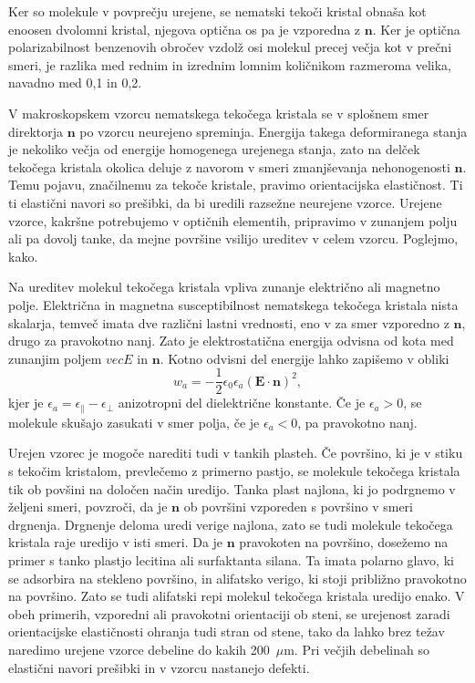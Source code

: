 Ker so molekule v povprečju urejene, se nematski tekoči kristal obnaša kot enoosen 
dvolomni kristal, njegova optična os pa je vzporedna z $\mathbf{n}$. 
Ker je optična polarizabilnost benzenovih obročev vzdolž osi molekul precej večja kot
v prečni smeri, je razlika med rednim in izrednim lomnim količnikom razmeroma velika, navadno med
0,1 in 0,2.

V makroskopskem vzorcu nematskega tekočega kristala se v splošnem smer
direktorja $\mathbf{n}$ po vzorcu neurejeno spreminja. Energija takega deformiranega 
stanja je nekoliko večja od energije homogenega urejenega stanja,
zato na delček tekočega kristala okolica deluje z navorom v smeri zmanjševanja 
nehonogenosti $\mathbf{n}$. Temu pojavu, značilnemu za tekoče kristale,
pravimo orientacijska elastičnost. Ti ti elastični navori so prešibki,
da bi uredili razsežne neurejene vzorce. Urejene vzorce, kakršne potrebujemo
v optičnih elementih, pripravimo v zunanjem polju ali pa dovolj tanke, da mejne 
površine vsilijo ureditev v celem vzorcu. Poglejmo, kako.

Na ureditev molekul tekočega kristala vpliva zunanje električno ali magnetno polje.
Električna in magnetna susceptibilnost nematskega tekočega
kristala nista skalarja, temveč imata dve različni lastni vrednosti,
eno v za smer vzporedno z $\mathbf{n}$, drugo za pravokotno nanj. Zato je
elektrostatična energija odvisna od kota med zunanjim poljem $vec{E}$
in $\mathbf{n}$. Kotno odvisni del energije lahko zapišemo v obliki
\begin{equation}
w_{a}=-\frac{1}{2}\epsilon_{0}\epsilon_{a}(\mathbf{E}\cdot\mathbf{n})^{2},
\label{7.56}
\end{equation}
kjer je $\epsilon_{a}=\epsilon_{\parallel}-\epsilon_{\perp}$ anizotropni
del dielektrične konstante. Če je $\epsilon_{a}>0$, se molekule skušajo
zasukati v smer polja, če je $\epsilon_{a}<0$, pa pravokotno nanj.

Urejen vzorec je mogoče narediti tudi v tankih plasteh. Če površino,
ki je v stiku s tekočim kristalom, prevlečemo z primerno pastjo, se
molekule tekočega kristala tik ob povšini na določen način uredijo.
Tanka plast najlona, ki jo podrgnemo v željeni smeri, povzroči, da
je $\mathbf{n}$ ob površini vzporeden s površino v smeri drgnenja. Drgnenje
deloma uredi verige najlona, zato se tudi molekule tekočega kristala
raje uredijo v isti smeri. Da je $\mathbf{n}$ pravokoten na površino,
dosežemo na primer s tanko plastjo lecitina ali surfaktanta silana. 
Ta imata polarno glavo, ki se adsorbira na stekleno površino, in alifatsko verigo, 
ki stoji približno pravokotno na površino. Zato se tudi alifatski repi molekul
tekočega kristala uredijo enako. V obeh primerih, vzporedni ali pravokotni
orientaciji ob steni, se urejenost zaradi orientacijske elastičnosti
ohranja tudi stran od stene, tako da lahko brez težav naredimo urejene
vzorce debeline do kakih 200~$\mu$m. Pri večjih debelinah so elastični
navori prešibki in v vzorcu nastanejo defekti.

